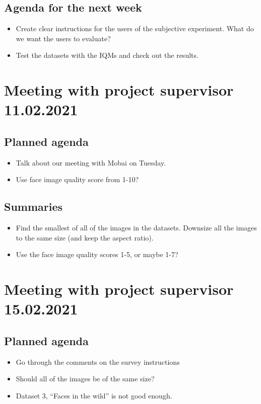 \subsection*{Agenda for the next week}
\begin{itemize}
    \item Create clear instructions for the users of the subjective experiment. What do we want the users to evaluate? 
    \item Test the datasets with the IQMs and check out the results.
\end{itemize}



\section*{Meeting with project supervisor 11.02.2021}
\subsection*{Planned agenda}
\begin{itemize}
    \item Talk about our meeting with Mobai on Tuesday.
    \item Use face image quality score from 1-10?
\end{itemize}

\subsection*{Summaries}
\begin{itemize}
    \item Find the smallest of all of the images in the datasets. Downsize all the images to the same size (and keep the aspect ratio).
    \item Use the  face image quality scores 1-5, or maybe 1-7?
\end{itemize}



\section*{Meeting with project supervisor 15.02.2021}
\subsection*{Planned agenda}
\begin{itemize}
    \item Go through the comments on the survey instructions
    \item Should all of the images be of the same size?
    \item Dataset 3, “Faces in the wild” is not good enough.
\end{itemize}

